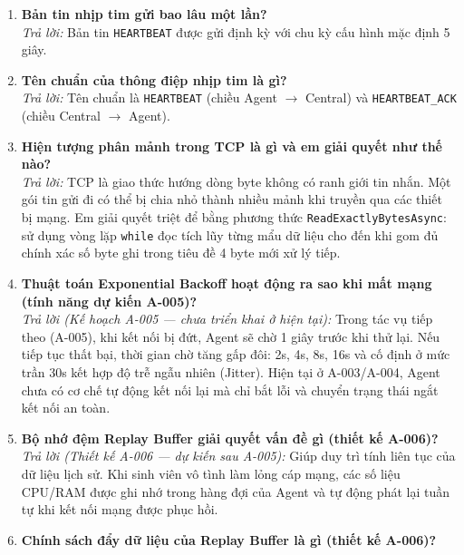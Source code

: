 \documentclass[12pt,a4paper]{article}
\begin{document}
\begin{enumerate}[leftmargin=*, label=\textbf{Câu \arabic*:}]
    \textit{Trả lời:} Agent chạy trên máy tính sinh viên, thường nằm sau tường lửa Windows Firewall và mạng NAT. Tường lửa mặc định chặn kết nối đi vào (Inbound) nhưng cho phép kết nối đi ra (Outbound). Do đó Agent phải đóng vai trò Client chủ động mở kết nối ra ngoài (Active Open) tới địa chỉ IP và cổng tĩnh của Central Server.
  \item \textbf{Bản tin nhịp tim gửi bao lâu một lần?} \\
    \textit{Trả lời:} Bản tin \texttt{HEARTBEAT} được gửi định kỳ với chu kỳ cấu hình mặc định 5 giây.
  \item \textbf{Tên chuẩn của thông điệp nhịp tim là gì?} \\
    \textit{Trả lời:} Tên chuẩn là \texttt{HEARTBEAT} (chiều Agent $\rightarrow$ Central) và \texttt{HEARTBEAT\_ACK} (chiều Central $\rightarrow$ Agent).
  \item \textbf{Hiện tượng phân mảnh trong TCP là gì và em giải quyết như thế nào?} \\
    \textit{Trả lời:} TCP là giao thức hướng dòng byte không có ranh giới tin nhắn. Một gói tin gửi đi có thể bị chia nhỏ thành nhiều mảnh khi truyền qua các thiết bị mạng. Em giải quyết triệt để bằng phương thức \texttt{ReadExactlyBytesAsync}: sử dụng vòng lặp \texttt{while} đọc tích lũy từng mẩu dữ liệu cho đến khi gom đủ chính xác số byte ghi trong tiêu đề 4 byte mới xử lý tiếp.
  \item \textbf{Thuật toán Exponential Backoff hoạt động ra sao khi mất mạng (tính năng dự kiến A-005)?} \\
    \textit{Trả lời (Kế hoạch A-005 — chưa triển khai ở hiện tại):} Trong tác vụ tiếp theo (A-005), khi kết nối bị đứt, Agent sẽ chờ 1 giây trước khi thử lại. Nếu tiếp tục thất bại, thời gian chờ tăng gấp đôi: 2s, 4s, 8s, 16s và cố định ở mức trần 30s kết hợp độ trễ ngẫu nhiên (Jitter). Hiện tại ở A-003/A-004, Agent chưa có cơ chế tự động kết nối lại mà chỉ bắt lỗi và chuyển trạng thái ngắt kết nối an toàn.
  \item \textbf{Bộ nhớ đệm Replay Buffer giải quyết vấn đề gì (thiết kế A-006)?} \\
    \textit{Trả lời (Thiết kế A-006 — dự kiến sau A-005):} Giúp duy trì tính liên tục của dữ liệu lịch sử. Khi sinh viên vô tình làm lỏng cáp mạng, các số liệu CPU/RAM được ghi nhớ trong hàng đợi của Agent và tự động phát lại tuần tự khi kết nối mạng được phục hồi.
  \item \textbf{Chính sách đẩy dữ liệu của Replay Buffer là gì (thiết kế A-006)?} \\

\end{enumerate}
\end{document}
